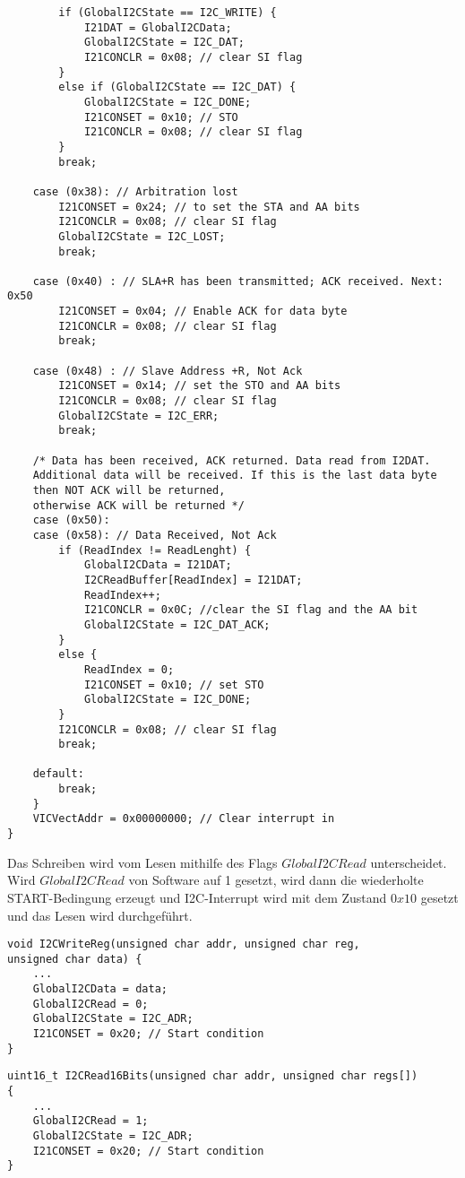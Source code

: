 \begin{lstlisting}
		if (GlobalI2CState == I2C_WRITE) {
			I21DAT = GlobalI2CData;
			GlobalI2CState = I2C_DAT;
			I21CONCLR = 0x08; // clear SI flag
		}
		else if (GlobalI2CState == I2C_DAT) {
			GlobalI2CState = I2C_DONE;
			I21CONSET = 0x10; // STO
			I21CONCLR = 0x08; // clear SI flag
		}
		break;
		
	case (0x38): // Arbitration lost
		I21CONSET = 0x24; // to set the STA and AA bits
		I21CONCLR = 0x08; // clear SI flag
		GlobalI2CState = I2C_LOST;
		break;
	
	case (0x40) : // SLA+R has been transmitted; ACK received. Next: 0x50
		I21CONSET = 0x04; // Enable ACK for data byte
		I21CONCLR = 0x08; // clear SI flag
		break;
	
	case (0x48) : // Slave Address +R, Not Ack
		I21CONSET = 0x14; // set the STO and AA bits
		I21CONCLR = 0x08; // clear SI flag
		GlobalI2CState = I2C_ERR;
		break;
	
	/* Data has been received, ACK returned. Data read from I2DAT.
	Additional data will be received. If this is the last data byte 
	then NOT ACK will be returned,
	otherwise ACK will be returned */
	case (0x50):
	case (0x58): // Data Received, Not Ack
		if (ReadIndex != ReadLenght) {
			GlobalI2CData = I21DAT;
			I2CReadBuffer[ReadIndex] = I21DAT;
			ReadIndex++;
			I21CONCLR = 0x0C; //clear the SI flag and the AA bit
			GlobalI2CState = I2C_DAT_ACK;
		}
		else {
			ReadIndex = 0;
			I21CONSET = 0x10; // set STO
			GlobalI2CState = I2C_DONE;
		}
		I21CONCLR = 0x08; // clear SI flag
		break;
	
	default:
		break;
	}	
	VICVectAddr = 0x00000000; // Clear interrupt in
}
\end{lstlisting}

Das Schreiben wird vom Lesen mithilfe des Flags $GlobalI2CRead$ unterscheidet. Wird $GlobalI2CRead$ von Software auf 1 gesetzt, wird dann die wiederholte START-Bedingung erzeugt und I2C-Interrupt wird mit dem Zustand $0x10$ gesetzt und das Lesen wird durchgeführt. 

\begin{lstlisting}
void I2CWriteReg(unsigned char addr, unsigned char reg, 
unsigned char data) {
	...
	GlobalI2CData = data;
	GlobalI2CRead = 0;
	GlobalI2CState = I2C_ADR;
	I21CONSET = 0x20; // Start condition
}
\end{lstlisting}

\begin{lstlisting}
uint16_t I2CRead16Bits(unsigned char addr, unsigned char regs[])  
{
	...
	GlobalI2CRead = 1;
	GlobalI2CState = I2C_ADR;
	I21CONSET = 0x20; // Start condition
}
\end{lstlisting}

